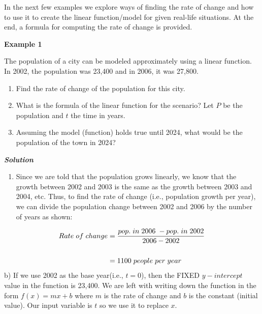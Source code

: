 \documentclass[
  letterpaper,
  DIV=11,
  numbers=noendperiod]{scrreprt}
\providecommand{\tightlist}{%
  \setlength{\itemsep}{0pt}\setlength{\parskip}{0pt}}\usepackage{longtable,booktabs,array}
\begin{document}
In the next few examples we explore ways of finding the rate of change
and how to use it to create the linear function/model for given
real-life situations. At the end, a formula for computing the rate of
change is provided.

\textbf{Example 1}

The population of a city can be modeled approximately using a linear
function. In 2002, the population was 23,400 and in 2006, it was 27,800.

\begin{enumerate}
\def\labelenumi{\alph{enumi})}
\item
  Find the rate of change of the population for this city.
\item
  What is the formula of the linear function for the scenario? Let \(P\)
  be the population and \(t\) the time in years.
\item
  Assuming the model (function) holds true until 2024, what would be the
  population of the town in 2024?
\end{enumerate}

\textbf{\emph{Solution}}

\begin{enumerate}
\def\labelenumi{\alph{enumi})}
\tightlist
\item
  Since we are told that the population grows linearly, we know that the
  growth between 2002 and 2003 is the same as the growth between 2003
  and 2004, etc. Thus, to find the rate of change (i.e., population
  growth per year), we can divide the population change between 2002 and
  2006 by the number of years as shown:
\end{enumerate}

\[
\begin{aligned} 
Rate\hspace{.04in} of\hspace{.04in} change &=  \frac{pop. \hspace{.04in} in \hspace{.04in} 2006 \hspace{.04in}- pop. \hspace{.04in} in \hspace{.04in} 2002}{2006-2002}\\\\&= 1100\hspace{.04in} people\hspace{.04in} per \hspace{.04in} year
\end{aligned}
\] b) If we use 2002 as the base year(i.e., \(t=0\)), then the FIXED
\(y-intercept\) value in the function is 23,400. We are left with
writing down the function in the form \(f(x)=mx+b\) where \(m\) is the
rate of change and \(b\) is the constant (initial value). Our input
variable is \(t\) so we use it to replace \(x\).
\end{document}
